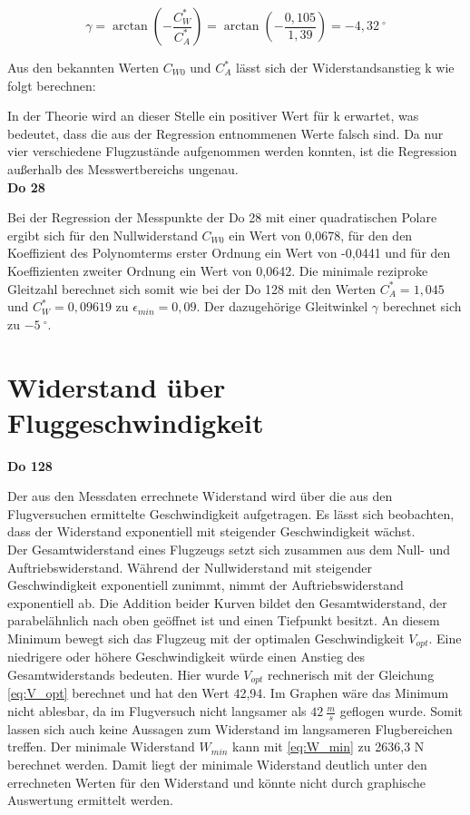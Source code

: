\begin{equation}
\gamma=\arctan \left(-\frac{C^{*}_W}{C^{*}_A} \right)= \arctan \left(-\frac{0,105}{1,39} \right)= -4,32 \ ^{\circ}  
\end{equation}

Aus den bekannten Werten $C_{W0}$ und $C^{*}_A$ lässt sich der Widerstandsanstieg k wie folgt berechnen: 


 In der Theorie wird an dieser Stelle ein positiver Wert für k erwartet, was bedeutet, dass die aus der Regression entnommenen Werte falsch sind. Da nur vier verschiedene Flugzustände aufgenommen werden konnten, ist die Regression außerhalb des Messwertbereichs ungenau. \\

\textbf{Do 28}

Bei der Regression der Messpunkte der Do 28 mit einer quadratischen Polare ergibt sich für den Nullwiderstand $C_{W0}$ ein Wert von 0,0678, für den den Koeffizient des Polynomterms erster Ordnung ein Wert von -0,0441 und für den Koeffizienten zweiter Ordnung ein Wert von 0,0642. Die minimale reziproke Gleitzahl berechnet sich somit wie bei der Do 128 mit den Werten 
$C^{*}_A=1,045$ und $C^{*}_W=0,09619$ zu $\epsilon_{min}=0,09$. 
Der dazugehörige Gleitwinkel $\gamma$ berechnet sich zu $-5 \ ^{\circ}$. 

\section{Widerstand über Fluggeschwindigkeit}

\textbf{Do 128}

Der aus den Messdaten errechnete Widerstand wird über die aus den Flugversuchen ermittelte Geschwindigkeit aufgetragen. Es lässt sich beobachten, dass der Widerstand exponentiell mit steigender Geschwindigkeit wächst. \\
Der Gesamtwiderstand eines Flugzeugs setzt sich zusammen aus dem Null- und Auftriebswiderstand. Während der Nullwiderstand mit steigender Geschwindigkeit exponentiell zunimmt, nimmt der Auftriebswiderstand exponentiell ab. Die Addition beider Kurven bildet den Gesamtwiderstand, der parabelähnlich nach oben geöffnet ist und einen Tiefpunkt besitzt. An diesem Minimum bewegt sich das Flugzeug mit der optimalen Geschwindigkeit $V_{opt}$. Eine niedrigere oder höhere Geschwindigkeit würde einen Anstieg des Gesamtwiderstands bedeuten. Hier wurde $V_{opt}$ rechnerisch mit der Gleichung \ref{eq:V_opt} berechnet und hat den Wert 42,94. Im Graphen wäre das Minimum nicht ablesbar, da im Flugversuch nicht langsamer als $42 \ \frac{m}{s}$ geflogen wurde. Somit lassen sich auch keine Aussagen zum Widerstand im langsameren Flugbereichen treffen. Der minimale Widerstand $W_{min}$ kann mit \ref{eq:W_min} zu 2636,3 N berechnet werden. Damit liegt der minimale Widerstand deutlich unter den errechneten Werten für den Widerstand und könnte nicht durch graphische Auswertung ermittelt werden.

